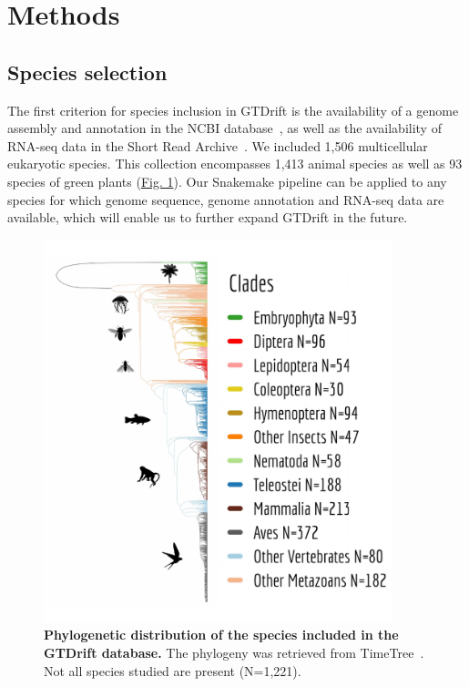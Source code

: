 \section{Methods}
\label{sec:methods}
\subsection{Species selection}
The first criterion for species inclusion in GTDrift is the availability of a genome assembly and annotation in the NCBI database~\citep{ncbi_resource_coordinators_database_2018, sayers_database_2022}, as well as the availability of RNA-seq data in the Short Read Archive~\citep{leinonen_sequence_2011}. We included 1,506 multicellular eukaryotic species. This collection encompasses 1,413 animal species as well as 93 species of green plants (\hyperref[fig:gtdrift1]{Fig. 1}). Our Snakemake pipeline can be applied to any species for which genome sequence, genome annotation and RNA-seq data are available, which will enable us to further expand GTDrift in the future\citep{molder_sustainable_2021}.

\begin{figure}[t]   
         \centering
        \includegraphics[width=0.9\textwidth]{Figure1.pdf}
                                                                           
    \caption[Phylogenetic distribution of the species included in the GTDrift database]{\textbf{Phylogenetic distribution of the species included in the GTDrift database.} The phylogeny was retrieved from TimeTree~\citep{kumar_timetree_2022}. Not all species studied are present (N=1,221).\newline}
    \label{fig:gtdrift1}
\end{figure}

